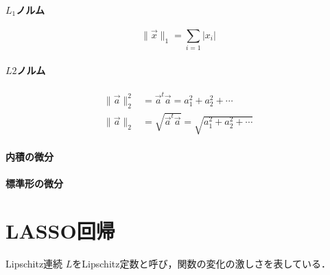 \paragraph{$L_1$ノルム}
\begin{equation}
    \|\vec{x}\|_1 = \sum_{i=1}|x_i|
\end{equation}

\paragraph*{$L2$ノルム}
\begin{align}
    \|\vec{a}\|^2_2 &= \vec{a}^t\vec{a} = a_1^2 + a_2^2 + \cdots\\[10pt]
    \|\vec{a}\|_2 &= \sqrt{\vec{a}^t\vec{a}} = \sqrt{a_1^2 + a_2^2 + \cdots}
\end{align}

\paragraph*{内積の微分}

\paragraph*{標準形の微分}




\section{LASSO回帰}

Lipschitz連続
$L$をLipschitz定数と呼び，関数の変化の激しさを表している．